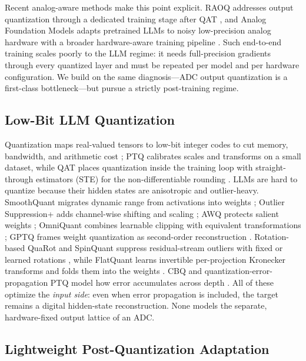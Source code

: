 \documentclass[letterpaper]{article} %
\theoremstyle{plain}
\begin{document}
Recent analog-aware methods make this point explicit. RAOQ addresses output quantization through a dedicated training stage after QAT \citep{tang2024raoq}, and Analog Foundation Models adapts pretrained LLMs to noisy low-precision analog hardware with a broader hardware-aware training pipeline \citep{buchel2025analog}. Such end-to-end training scales poorly to the LLM regime: it needs full-precision gradients through every quantized layer and must be repeated per model and per hardware configuration. We build on the same diagnosis---ADC output quantization is a first-class bottleneck---but pursue a strictly post-training regime.

\subsection{Low-Bit LLM Quantization}

Quantization maps real-valued tensors to low-bit integer codes to cut memory, bandwidth, and arithmetic cost \citep{gholami2021survey,jacob2018quantization}; PTQ calibrates scales and transforms on a small dataset, while QAT places quantization inside the training loop with straight-through estimators (STE) for the non-differentiable rounding \citep{esser2019learned}. LLMs are hard to quantize because their hidden states are anisotropic and outlier-heavy. SmoothQuant migrates dynamic range from activations into weights \citep{xiao2022smoothquant}; Outlier Suppression+ adds channel-wise shifting and scaling \citep{wei2023outlier}; AWQ protects salient weights \citep{lin2023awq}; OmniQuant combines learnable clipping with equivalent transformations \citep{shao2023omniquant}; GPTQ frames weight quantization as second-order reconstruction \citep{frantar2022gptq}. Rotation-based QuaRot and SpinQuant suppress residual-stream outliers with fixed or learned rotations \citep{ashkboos2024quarot,liu2024spinquant}, while FlatQuant learns invertible per-projection Kronecker transforms and folds them into the weights \citep{liu2024flatquant}. CBQ and quantization-error-propagation PTQ model how error accumulates across depth \citep{ding2023cbq,qep2025}. All of these optimize the \emph{input side}: even when error propagation is included, the target remains a digital hidden-state reconstruction. None models the separate, hardware-fixed output lattice of an ADC.

\subsection{Lightweight Post-Quantization Adaptation}
\end{document}
